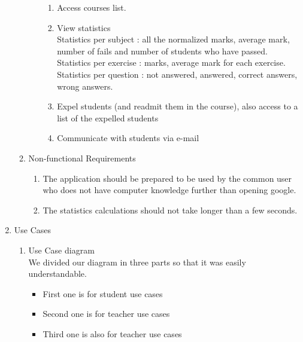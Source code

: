 \documentclass{article}
\renewcommand\labelitemi{$\cdot$ }
\begin{document}
\begin{enumerate}
\begin{enumerate}
\begin{enumerate}
\begin{enumerate}
				\item Access courses list.\\
				\item View statistics\\
				Statistics per subject : all the normalized marks, average mark, number of fails and number of students who have passed.\\
				Statistics per exercise : marks, average mark for each exercise.\\
				Statistics per question : not answered, answered, correct answers, wrong answers.\\
				\item Expel students (and readmit them in the course), also access to a list of the expelled students\\
				\item Communicate with students via e-mail\\
				
				 
			\end{enumerate}
		\end{enumerate}
		\item{Non-functional Requirements}
			\begin{enumerate}
				\item The application should be prepared to be used by the common user who does not have computer knowledge further than opening google.
				\item The statistics calculations should not take longer than a few seconds.
			\end{enumerate}
	\end{enumerate}
	\newpage
	\item{Use Cases}
	\begin{enumerate}
		\item{Use Case diagram}
		\\
		We divided our diagram in three parts so that it was easily understandable.\\
		\begin{itemize}
			\renewcommand\labelitemi{$\star$}
			\item First one is for student use cases
			\item Second one is for teacher use cases
			\item Third one is also for teacher use cases \\ \\
		\end{itemize}
	

\end{enumerate}
\end{enumerate}
\end{document}

